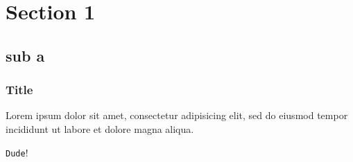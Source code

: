 


\begin{frame}
\titlepage
\end{frame}

\section{Section 1}
\subsection{sub a}

\begin{frame}

\frametitle{Title}
Lorem ipsum dolor sit amet, consectetur adipisicing elit, sed do eiusmod tempor incididunt ut labore et dolore magna aliqua.

\verb|Dude|!

\end{frame}


